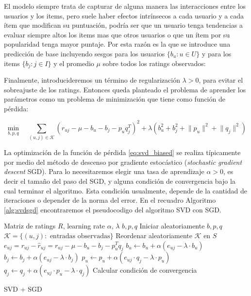 \documentclass[hidelinks,12pt,a4paper]{book}
\providecommand{\norm}[1]{\lVert#1\rVert}
\theoremstyle{plain}
\theoremstyle{definition}
\begin{document}
El modelo siempre trata de capturar de alguna manera las interacciones entre los usuarios y los items, pero suele haber efectos intrínsecos a cada usuario y a cada ítem que modifican su puntuación, podría ser que un usuario tenga tendencias a evaluar siempre altos los items mas que otros usuarios o que un ítem por su popularidad tenga mayor puntaje. Por esta razón es la que se introduce una predicción de base incluyendo sesgos para los usuarios $\{b_u:u\in {U}\}$ y para los items $\{b_j:j\in {I}\}$ y el promedio $\mu$ sobre todos los ratings observados:

Finalmente, introducideremos un término de regularización $\lambda>0$, para evitar el sobreajuste de los ratings. Entonces queda planteado el problema de aprender los parámetros como un problema de minimización que tiene como función de pérdida:

\begin{equation}
\label{eq:svd_biased}
\min_{b,p,q} \quad \sum_{(u,j)\in \mathcal{K}} (r_{uj}-\mu-b_u-b_j-p_u q^T_j)^2+\lambda (b_u^2+b_j^2+\norm{p_u}^2+\norm{q_j}^2)
\end{equation}

La optimización de la función de pérdida \eqref{eq:svd_biased} se realiza típicamente por medio del método de descenso por gradiente estocástico (\textit{stochastic gradient descent} SGD). Para lo necesitaremos elegir una tasa de aprendizaje $\alpha>0$, es decir el tamaño del paso del SGD, y alguna condición de convergencia bajo la cual terminar el algoritmo. Esta condición usualmente, depende de la cantidad de iteraciones o depender de la norma del error. En el recuadro Algoritmo \ref{alg:svdsgd} encontraremos el pseudocodigo del algoritmo SVD con SGD.

\begin{algorithm}[H]
\begin{algorithmic}[SGD]
\REQUIRE Matriz de ratings $R$, learning rate $\alpha$, $\lambda$ 
\ENSURE $b,p,q$
\STATE Iniciar aleatoriamente $b,p,q$
\STATE $\mathcal{K}=\{(u,j): \text{ entradas observadas}\}$
\STATE Reordenar aleatoriamente $\mathcal{K}$ en $S$
\STATE $e_{uj}=r_{uj}-\hat{r}_{uj}=r_{uj}-\mu-b_u-b_j-p_u^T q_j$
\STATE $b_u \leftarrow b_u + \alpha (e_{uj} - \lambda \cdot b_u)$
\STATE $b_j \leftarrow b_j + \alpha (e_{uj} - \lambda \cdot b_j)$
\STATE $p_u \leftarrow p_u + \alpha (e_{uj} \cdot q_j - \lambda \cdot p_u)$
\STATE $q_j \leftarrow q_j + \alpha (e_{uj} \cdot p_u - \lambda \cdot q_j)$
\ENDFOR
\STATE Calcular condición de convergencia
\ENDWHILE
\end{algorithmic}
\caption{SVD + SGD}\label{alg:svdsgd}
\end{algorithm}
\end{document}
